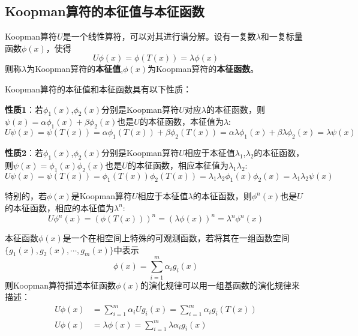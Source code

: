 \subsection{Koopman算符的本征值与本征函数}
Koopman算符$U$是一个线性算符，可以对其进行谱分解\cite{JJY2015Koopman}。设有一复数$\lambda$和一复标量函数$\phi(x)$，使得
\begin{equation}
    U\phi(x)=\phi(T(x))=\lambda\phi(x)
\end{equation}
则称$\lambda$为Koopman算符的\textbf{本征值},$\phi(x)$为Koopman算符的\textbf{本征函数}。

Koopman算符的本征值和本征函数具有以下性质\cite{JJY2015Koopman}：

\textbf{性质1}：若$\phi_1(x)$,$\phi_2(x)$分别是Koopman算符$U$对应$\lambda$的本征函数，则$\psi(x)=\alpha\phi_1(x)+\beta\phi_2(x)$也是$U$的本征函数，本征值为$\lambda$:
\begin{equation}
    U\psi(x)=\psi(T(x))=\alpha\phi_1(T(x))+\beta\phi_2(T(x))=\alpha\lambda\phi_1(x)+\beta
    \lambda\phi_2(x)=\lambda\psi(x)
\end{equation}

\textbf{性质2}：若$\phi_1(x)$,$\phi_2(x)$分别是Koopman算符$U$相应于本征值$\lambda_1$,$\lambda_2$的本征函数，则$\psi(x)=\phi_1(x)\phi_2(x)$也是$U$的本征函数，相应本征值为$\lambda_1\lambda_2$: 
\begin{equation}
U\psi(x)=\psi(T(x))=\phi_1(T(x))\phi_2(T(x))=\lambda_1\lambda_2\phi_1(x)\phi_2(x)=\lambda_1\lambda_2\psi(x)
\end{equation}

特别的，若$\phi(x)$是Koopman算符$U$相应于本征值$\lambda$的本征函数，则$\phi^n(x)$也是$U$的本征函数，相应的本征值为$\lambda^n$:
\begin{equation}
    U\phi^n(x)=(\phi(T(x)))^n=(\lambda\phi(x))^n=\lambda^n\phi^n(x)
\end{equation}

本征函数$\phi(x)$是一个在相空间上特殊的可观测函数，若将其在一组函数空间$\{g_1(x),g_2(x),\cdots,g_m(x)\}$中表示
\begin{equation}
    \phi(x)=\sum_{i=1}^m\alpha_ig_i(x)
\end{equation}
则Koopman算符描述本征函数$\phi(x)$的演化规律可以用一组基函数的演化规律来描述：
\begin{equation}
    \begin{aligned}
        U\phi(x)&=\sum_{i=1}^m\alpha_iUg_i(x)=\sum_{i=1}^m\alpha_ig_i(T(x))\\
        U\phi(x)&=\lambda\phi(x)=\sum_{i=1}^m\lambda\alpha_ig_i(x)
    \end{aligned}
\end{equation}


